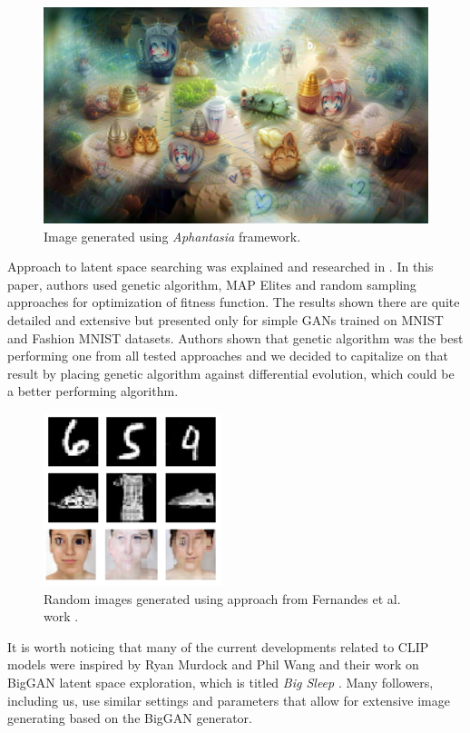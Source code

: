 \documentclass[12pt,a4paper,openany]{book}
\begin{document}
\begin{figure}[H]
    \centering
    \includegraphics[scale=0.6]{figs/aphantasia.png}
    \caption{Image generated using \textit{Aphantasia} \cite{aphantasia} framework.}\label{Fig:Aphantasia}
\end{figure}

\noindent Approach to latent space searching was explained and researched in \cite{coimbra}. In this paper, authors used genetic algorithm, MAP Elites and random sampling approaches for optimization of fitness function. The results shown there are quite detailed and extensive but presented only for simple GANs trained on MNIST and Fashion MNIST datasets. Authors shown that genetic algorithm was the best performing one from all tested approaches and we decided to capitalize on that result by placing genetic algorithm against differential evolution, which could be a better performing algorithm.

\begin{figure}[H]
    \centering
    \includegraphics[scale=1.0]{figs/coimbra.png}
    \caption{Random images generated using approach from Fernandes et al. work \cite{coimbra}.}\label{Fig:coimbra}
\end{figure}

\noindent It is worth noticing that many of the current developments related to CLIP models were inspired by Ryan Murdock and Phil Wang and their work on BigGAN latent space exploration, which is titled \textit{Big Sleep} \cite{bigsleep}. Many followers, including us, use similar settings and parameters that allow for extensive image generating based on the BigGAN generator.
\end{document}
